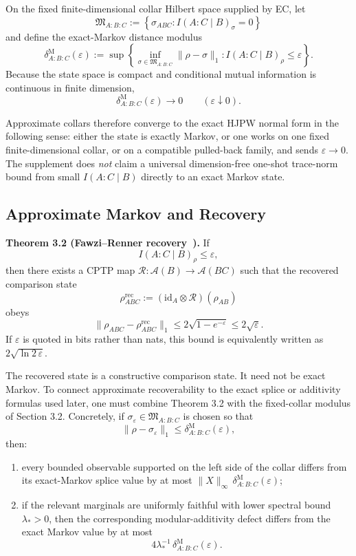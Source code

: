 On the fixed finite-dimensional collar Hilbert space supplied by EC, let
\[
\mathfrak M_{A:B:C}
:=
\left\{
\sigma_{ABC}: I(A:C\mid B)_\sigma=0
\right\}
\]
and define the exact-Markov distance modulus
\[
\delta^{\mathrm M}_{A:B:C}(\varepsilon)
:=
\sup\left\{
\inf_{\sigma\in\mathfrak M_{A:B:C}}\|\rho-\sigma\|_1:
I(A:C\mid B)_\rho\le\varepsilon
\right\}.
\]
Because the state space is compact and conditional mutual information is continuous in finite dimension,
\[
\delta^{\mathrm M}_{A:B:C}(\varepsilon)\longrightarrow0
\qquad
(\varepsilon\downarrow0).
\]

Approximate collars therefore converge to the exact HJPW normal form in the following sense:
either the state is exactly Markov, or one works on one fixed finite-dimensional collar, or on a
compatible pulled-back family, and sends \(\varepsilon\to0\). The supplement does \emph{not}
claim a universal dimension-free one-shot trace-norm bound from small \(I(A:C\mid B)\) directly
to an exact Markov state.

\subsection{Approximate Markov and Recovery}\label{33-approximate-markov-and-recovery}

\textbf{Theorem 3.2 (Fawzi--Renner recovery~\cite{fawziRenner15}).} If
\[
I(A:C\mid B)_\rho\le\varepsilon,
\]
then there exists a CPTP map \(\mathcal R:\mathcal A(B)\to\mathcal A(BC)\) such that the recovered comparison state
\[
\rho^{\mathrm{rec}}_{ABC}
:=
(\mathrm{id}_A\otimes\mathcal R)(\rho_{AB})
\]
obeys
\[
\|\rho_{ABC}-\rho^{\mathrm{rec}}_{ABC}\|_1
\le
2\sqrt{1-e^{-\varepsilon}}
\le
2\sqrt{\varepsilon}.
\]
If \(\varepsilon\) is quoted in bits rather than nats, this bound is equivalently written as \(2\sqrt{\ln 2\,\varepsilon}\).

The recovered state is a constructive comparison state. It need not be exact Markov. To connect approximate recoverability to the exact splice or additivity formulas used later, one must combine Theorem 3.2 with the fixed-collar modulus of Section 3.2. Concretely, if \(\sigma_\varepsilon\in\mathfrak M_{A:B:C}\) is chosen so that
\[
\|\rho-\sigma_\varepsilon\|_1
\le
\delta^{\mathrm M}_{A:B:C}(\varepsilon),
\]
then:
\begin{enumerate}
\item every bounded observable supported on the left side of the collar differs from its exact-Markov splice value by at most \(\|X\|_\infty\,\delta^{\mathrm M}_{A:B:C}(\varepsilon)\);
\item if the relevant marginals are uniformly faithful with lower spectral bound \(\lambda_\ast>0\), then the corresponding modular-additivity defect differs from the exact Markov value by at most
\[
4\lambda_\ast^{-1}\,
\delta^{\mathrm M}_{A:B:C}(\varepsilon).
\]
\end{enumerate}

